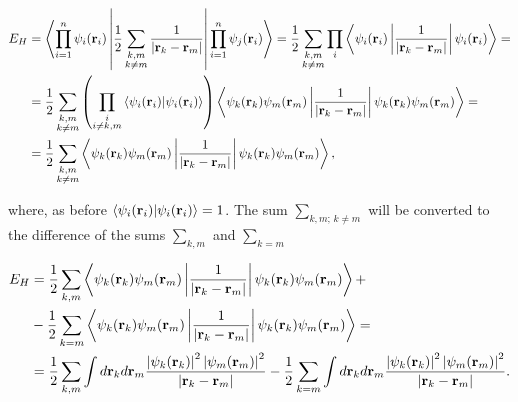 \begin{equation}
    \label{Eq:energy_hartree1}
    \begin{aligned}
        E_H&=\left<\prod_{i=1}^n\psi_i(\mathbf{r}_i)\left|\frac{1}{2}\sum_{\substack{k,m\\k\neq m}}\frac{1}{\left|\mathbf{r}_k-\mathbf{r}_m\right|}\right|\prod_{i=1}^n\psi_j(\mathbf{r}_i)\right>=\frac{1}{2}\sum_{\substack{k,m\\k\neq m}}\prod_{i}\left<\psi_i(\mathbf{r}_i)\left|\frac{1}{\left|\mathbf{r}_k-\mathbf{r}_m\right|}\right|\psi_i(\mathbf{r}_i)\right>=\\
        &=\frac{1}{2}\sum_{\substack{k,m\\k\neq m}}\left(\prod_{\substack{i\\i\neq k,m}}\left<\psi_i(\mathbf{r}_i)|\psi_i(\mathbf{r}_i)\right>\right)\left<\psi_k(\mathbf{r}_k)\psi_m(\mathbf{r}_m)\left|\frac{1}{\left|\mathbf{r}_k-\mathbf{r}_m\right|}\right|\psi_k(\mathbf{r}_k)\psi_m(\mathbf{r}_m)\right>=\\
        &=\frac{1}{2}\sum_{\substack{k,m\\k\neq m}}\left<\psi_k(\mathbf{r}_k)\psi_m(\mathbf{r}_m)\left|\frac{1}{\left|\mathbf{r}_k-\mathbf{r}_m\right|}\right|\psi_k(\mathbf{r}_k)\psi_m(\mathbf{r}_m)\right>,
    \end{aligned}
\end{equation}

where, as before $\left<\psi_i(\mathbf{r}_i)|\psi_i(\mathbf{r}_i)\right>=1$.
The sum $\sum_{k,m;\,k\neq m}$ will be converted to the difference of the sums $\sum_{k,m}$ and $\sum_{k=m}$

\begin{equation}
    \label{Eq:energy_hartree2}
    \begin{aligned}
        E_H&=\frac{1}{2}\sum_{k,m}\left<\psi_k(\mathbf{r}_k)\psi_m(\mathbf{r}_m)\left|\frac{1}{\left|\mathbf{r}_k-\mathbf{r}_m\right|}\right|\psi_k(\mathbf{r}_k)\psi_m(\mathbf{r}_m)\right>+\\
        &-\frac{1}{2}\sum_{k=m}\left<\psi_k(\mathbf{r}_k)\psi_m(\mathbf{r}_m)\left|\frac{1}{\left|\mathbf{r}_k-\mathbf{r}_m\right|}\right|\psi_k(\mathbf{r}_k)\psi_m(\mathbf{r}_m)\right>=\\
        &=\frac{1}{2}\sum_{k,m}\int d\mathbf{r}_kd\mathbf{r}_m\frac{\left|\psi_k(\mathbf{r}_k)\right|^2\left|\psi_m(\mathbf{r}_m)\right|^2}{\left|\mathbf{r}_k-\mathbf{r}_m\right|}-\frac{1}{2}\sum_{k=m}\int d\mathbf{r}_kd\mathbf{r}_m\frac{\left|\psi_k(\mathbf{r}_k)\right|^2\left|\psi_m(\mathbf{r}_m)\right|^2}{\left|\mathbf{r}_k-\mathbf{r}_m\right|}.
    \end{aligned}
\end{equation}

